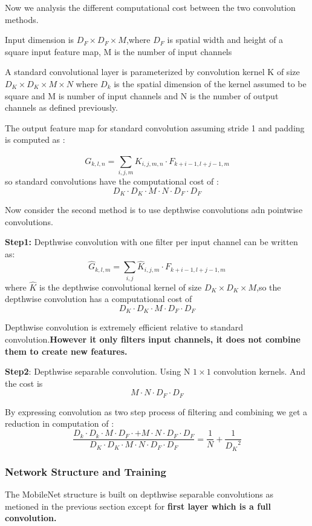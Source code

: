 \documentclass[11pt,en,bibstyle=ieeetr]{elegantpaper}
\begin{document}
Now we analysis the different computational cost between the two convolution methods.

Input dimension is $ D_F \times D_F \times M $,where $ D_F $ is spatial width and height of a square input feature map, M is the number of input channels

A standard convolutional layer is parameterized by convolution kernel K of size $ D_K \times D_K \times M \times N $ where $ D_k $ is the spatial dimension of the kernel assumed to be square and M is number of input channels and N is the number of output channels as defined previously.

The output feature map for standard convolution assuming stride 1 and padding is computed as :

$$ 
G_{k,l,n} = \sum_{i,j,m}^{} K_{i,j,m,n}\cdot F_{k+i-1,l+j-1,m}
$$
so standard convolutions have the computational cost of :
$$ 
D_K \cdot D_K \cdot M \cdot N \cdot D_F \cdot D_F
$$

Now consider the second method is to use depthwise convolutions adn pointwise convolutions.

\textbf{Step1:} Depthwise convolution with one filter per input channel can be written as:
$$ 
\hat{G}_{k,l,m} = \sum_{i,j}^{} \hat{K}_{i,j,m}\cdot F_{k+i-1,l+j-1,m}
$$
where $ \hat{K} $ is the depthwise convolutional kernel of size $ D_K\times D_K\times M $,so the depthwise convolution has a computational cost of 
$$ 
D_K\cdot D_K\cdot M \cdot D_F \cdot D_F
$$

Depthwise convolution is extremely efficient relative to standard convolution.\textbf{However it only filters input channels, it does not combine them to create new features.}

\textbf{Step2}: Depthwise separable convolution. Using N $ 1\times 1 $ convolution kernels. And the cost is 
$$ 
M\cdot N \cdot D_F \cdot D_F
$$

By expressing convolution as two step process of filtering and combining we get a reduction in computation of :
$$ 
\frac{D_k\cdot D_k\cdot M\cdot D_F \cdot + M\cdot N\cdot D_F \cdot D_F}{D_K \cdot D_K\cdot M \cdot N \cdot D_F \cdot D_F   } = \frac{1}{N}+\frac{1}{{D_K}^2}
$$


\subsubsection{Network Structure and Training}

The MobileNet structure is built on depthwise separable convolutions as metioned in the previous section except for \textbf{first layer which is a full convolution.}
\end{document}
